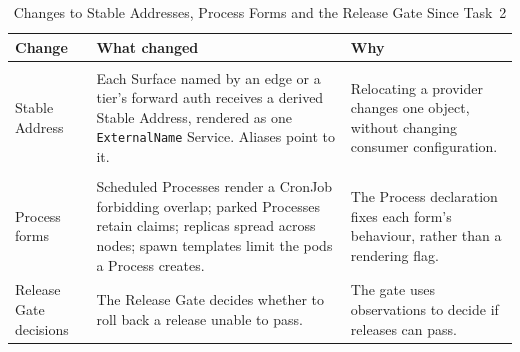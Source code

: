 \begin{table}[!htbp]
\centering
\footnotesize
\begin{tabular}{>{\raggedright\arraybackslash}p{}>{\raggedright\arraybackslash}p{}>{\raggedright\arraybackslash}p{}}
\hline
\textbf{Change} & \textbf{What changed} & \textbf{Why} \\
\hline
\multicolumn{3}{l}{\textit{Stable Addresses}} \\
Stable Address & Each Surface named by an edge or a tier's forward auth receives a derived Stable Address, rendered as one \texttt{ExternalName} Service. Aliases point to it. & Relocating a provider changes one object, without changing consumer configuration. \\
\multicolumn{3}{l}{\textit{Process forms and the Release Gate}} \\
Process forms & Scheduled Processes render a CronJob forbidding overlap; parked Processes retain claims; replicas spread across nodes; spawn templates limit the pods a Process creates. & The Process declaration fixes each form's behaviour, rather than a rendering flag. \\
Release Gate decisions & The Release Gate decides whether to roll back a release unable to pass. & The gate uses observations to decide if releases can pass. \\
\hline
\end{tabular}
\caption{Changes to Stable Addresses, Process Forms and the Release Gate Since Task~2}
\label{tab:app-transform-4}
\end{table}


